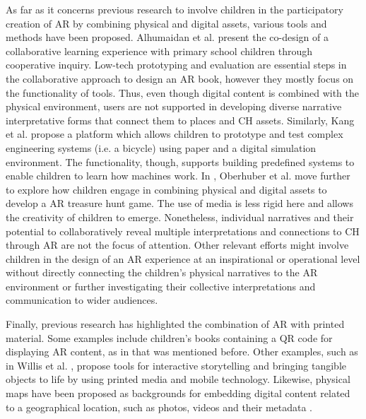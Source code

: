 \documentclass[acmlarge,screen,dvipsnames]{acmart}
\begin{document}
As far as it concerns previous research to involve children in the participatory creation of AR by combining physical and digital assets, various tools and methods have been proposed. Alhumaidan et al. \cite{ALHUMAIDAN201824} present the co-design of a collaborative learning experience with primary school children through cooperative inquiry. Low-tech prototyping and evaluation are essential steps in the collaborative approach to design an AR book, however they mostly focus on the functionality of tools. Thus, even though digital content is combined with the physical environment, users are not supported in developing diverse narrative interpretative forms that connect them to places and CH assets. Similarly, Kang et al. \cite{10.1145/3173225.3173264} propose a platform which allows children to prototype and test complex engineering systems (i.e. a bicycle) using paper and a digital simulation environment. The functionality, though, supports building predefined systems to enable children to learn how machines work. In \cite{Oberhuber2017}, Oberhuber et al. move further to explore how children engage in combining physical and digital assets to develop a AR treasure hunt game. The use of media is less rigid here and allows the creativity of children to emerge. Nonetheless, individual narratives and their potential to collaboratively reveal multiple interpretations and connections to CH through AR are not the focus of attention. Other relevant efforts \cite{Tobar-Munoz2016,Schofield2019,Santos2014} might involve children in the design of an AR experience at an inspirational or operational level without directly connecting the children's physical narratives to the AR environment or further investigating their collective interpretations and communication to wider audiences. 

\color{blue}

Finally, previous research has highlighted the combination of AR with printed material. Some examples include children's books containing a QR code for displaying AR content, as in \cite{ALHUMAIDAN201824} that was mentioned before. Other examples, such as in Willis et al. \cite{10.1145/2460625.2460682}, propose tools for interactive storytelling and bringing tangible objects to life by using printed media and mobile technology. Likewise, physical maps have been proposed as backgrounds for embedding digital content related to a geographical location, such as photos, videos and their metadata \cite{Morrison:2009:LBA:1518701.1518991,
Terracciano:2017:MMR:3027063.3052958}.
\end{document}
